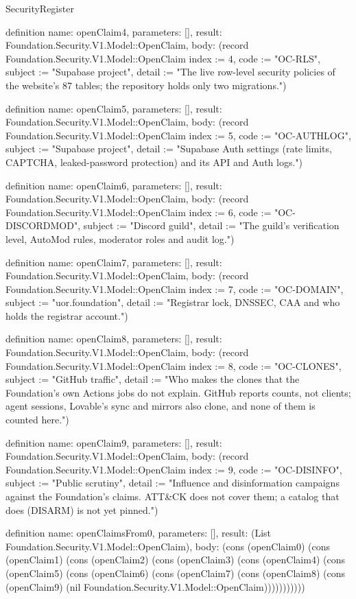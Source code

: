 \begin{lexlean}{SecurityRegister}
\begin{semanticmodule}
definition{
  name: openClaim4,
  parameters: [],
  result: Foundation.Security.V1.Model::OpenClaim,
  body: (record Foundation.Security.V1.Model::OpenClaim {index := 4, code := "OC-RLS", subject := "Supabase project", detail := "The live row-level security policies of the website's 87 tables; the repository holds only two migrations."})
}

definition{
  name: openClaim5,
  parameters: [],
  result: Foundation.Security.V1.Model::OpenClaim,
  body: (record Foundation.Security.V1.Model::OpenClaim {index := 5, code := "OC-AUTHLOG", subject := "Supabase project", detail := "Supabase Auth settings (rate limits, CAPTCHA, leaked-password protection) and its API and Auth logs."})
}

definition{
  name: openClaim6,
  parameters: [],
  result: Foundation.Security.V1.Model::OpenClaim,
  body: (record Foundation.Security.V1.Model::OpenClaim {index := 6, code := "OC-DISCORDMOD", subject := "Discord guild", detail := "The guild's verification level, AutoMod rules, moderator roles and audit log."})
}

definition{
  name: openClaim7,
  parameters: [],
  result: Foundation.Security.V1.Model::OpenClaim,
  body: (record Foundation.Security.V1.Model::OpenClaim {index := 7, code := "OC-DOMAIN", subject := "uor.foundation", detail := "Registrar lock, DNSSEC, CAA and who holds the registrar account."})
}

definition{
  name: openClaim8,
  parameters: [],
  result: Foundation.Security.V1.Model::OpenClaim,
  body: (record Foundation.Security.V1.Model::OpenClaim {index := 8, code := "OC-CLONES", subject := "GitHub traffic", detail := "Who makes the clones that the Foundation's own Actions jobs do not explain. GitHub reports counts, not clients; agent sessions, Lovable's sync and mirrors also clone, and none of them is counted here."})
}

definition{
  name: openClaim9,
  parameters: [],
  result: Foundation.Security.V1.Model::OpenClaim,
  body: (record Foundation.Security.V1.Model::OpenClaim {index := 9, code := "OC-DISINFO", subject := "Public scrutiny", detail := "Influence and disinformation campaigns against the Foundation's claims. ATT&CK does not cover them; a catalog that does (DISARM) is not yet pinned."})
}

definition{
  name: openClaimsFrom0,
  parameters: [],
  result: (List Foundation.Security.V1.Model::OpenClaim),
  body: (cons (openClaim0) (cons (openClaim1) (cons (openClaim2) (cons (openClaim3) (cons (openClaim4) (cons (openClaim5) (cons (openClaim6) (cons (openClaim7) (cons (openClaim8) (cons (openClaim9) (nil Foundation.Security.V1.Model::OpenClaim)))))))))))
}


\end{semanticmodule}
\end{lexlean}
